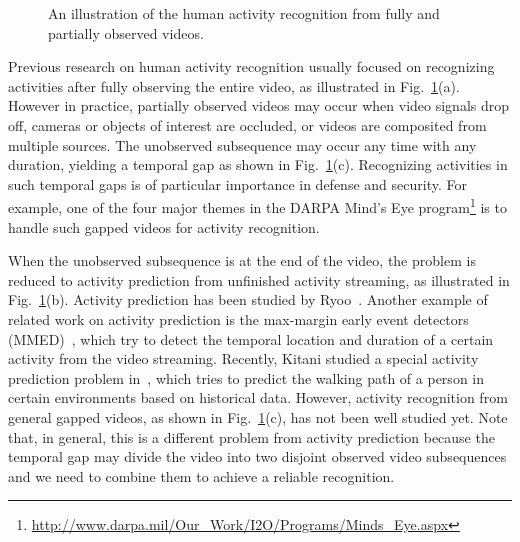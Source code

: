 \begin{figure}[htbp]
  \begin{center}
    \quad
  \end{center}
  \vspace{-4mm}
  \caption{An illustration of the human activity recognition from fully and partially observed videos.}
  \vspace{-4mm}
  \label{fig:problem_illustration}
\end{figure}
Previous research on human activity recognition usually focused on recognizing
activities after fully observing the entire video, as illustrated in
Fig.~\ref{fig:problem_illustration}(a).  However in practice, partially
observed videos may occur when video signals drop off, cameras or objects of
interest are occluded, or videos are composited from multiple sources. The
unobserved subsequence may occur any time with any duration, yielding a
temporal gap as shown in Fig.~\ref{fig:problem_illustration}(c).  Recognizing
activities in such temporal gaps is of particular importance in defense and
security. For example, one of the four major themes in the DARPA Mind's Eye
program\footnote{\url{http://www.darpa.mil/Our_Work/I2O/Programs/Minds_Eye.aspx}}
is to handle such gapped videos for activity recognition.

When the unobserved subsequence is at the end of the video, the problem is
{\color{black} reduced} to activity prediction from unfinished activity
streaming, as illustrated in Fig.~\ref{fig:problem_illustration}(b).  Activity
prediction has been studied by Ryoo~\cite{Ryoo2011}. Another example of related
work on activity prediction is the max-margin early event detectors
(MMED)~\cite{MMED2012}, which try to detect the temporal location and duration
of a certain activity from the video streaming. {\color{black}Recently, Kitani
  \etal studied a special activity prediction problem
  in~\cite{Kitani_2012_7250}, which tries to predict the walking path of a
  person in certain environments based on historical data}. However, activity
recognition from general gapped videos, as shown in
Fig.~\ref{fig:problem_illustration}(c), has not been well studied yet.  Note
that, in general, this is a different problem from activity prediction because
the temporal gap may divide the video into two disjoint observed video
subsequences and we need to combine them to achieve a reliable recognition.

